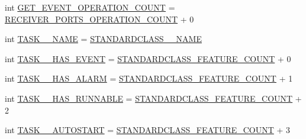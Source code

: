 \begin{DoxyCompactItemize}
\item 
int \hyperlink{interfaceshootingmachineemfmodel_1_1_shootingmachineemfmodel_package_a9000680fce702b54d9bf48bd64789be7}{G\-E\-T\-\_\-\-E\-V\-E\-N\-T\-\_\-\-O\-P\-E\-R\-A\-T\-I\-O\-N\-\_\-\-C\-O\-U\-N\-T} = \hyperlink{interfaceshootingmachineemfmodel_1_1_shootingmachineemfmodel_package_a784cd8ee08945f45f89ceb08f5a717e5}{R\-E\-C\-E\-I\-V\-E\-R\-\_\-\-P\-O\-R\-T\-S\-\_\-\-O\-P\-E\-R\-A\-T\-I\-O\-N\-\_\-\-C\-O\-U\-N\-T} + 0
\item 
int \hyperlink{interfaceshootingmachineemfmodel_1_1_shootingmachineemfmodel_package_a62650844ac979a7c21389bde0193fea2}{T\-A\-S\-K\-\_\-\-\_\-\-N\-A\-M\-E} = \hyperlink{interfaceshootingmachineemfmodel_1_1_shootingmachineemfmodel_package_a06475d7d54d52ee19b2aaf4d5d73c738}{S\-T\-A\-N\-D\-A\-R\-D\-C\-L\-A\-S\-S\-\_\-\-\_\-\-N\-A\-M\-E}
\item 
int \hyperlink{interfaceshootingmachineemfmodel_1_1_shootingmachineemfmodel_package_ab400549825734d82cb9b6835551aacc6}{T\-A\-S\-K\-\_\-\-\_\-\-H\-A\-S\-\_\-\-E\-V\-E\-N\-T} = \hyperlink{interfaceshootingmachineemfmodel_1_1_shootingmachineemfmodel_package_a14037f66989b3107e402142df96ee9aa}{S\-T\-A\-N\-D\-A\-R\-D\-C\-L\-A\-S\-S\-\_\-\-F\-E\-A\-T\-U\-R\-E\-\_\-\-C\-O\-U\-N\-T} + 0
\item 
int \hyperlink{interfaceshootingmachineemfmodel_1_1_shootingmachineemfmodel_package_a86b86fa479cfc7162ae9b30bf99faa27}{T\-A\-S\-K\-\_\-\-\_\-\-H\-A\-S\-\_\-\-A\-L\-A\-R\-M} = \hyperlink{interfaceshootingmachineemfmodel_1_1_shootingmachineemfmodel_package_a14037f66989b3107e402142df96ee9aa}{S\-T\-A\-N\-D\-A\-R\-D\-C\-L\-A\-S\-S\-\_\-\-F\-E\-A\-T\-U\-R\-E\-\_\-\-C\-O\-U\-N\-T} + 1
\item 
int \hyperlink{interfaceshootingmachineemfmodel_1_1_shootingmachineemfmodel_package_a6dfa46683e73ddc332624916d8e636cf}{T\-A\-S\-K\-\_\-\-\_\-\-H\-A\-S\-\_\-\-R\-U\-N\-N\-A\-B\-L\-E} = \hyperlink{interfaceshootingmachineemfmodel_1_1_shootingmachineemfmodel_package_a14037f66989b3107e402142df96ee9aa}{S\-T\-A\-N\-D\-A\-R\-D\-C\-L\-A\-S\-S\-\_\-\-F\-E\-A\-T\-U\-R\-E\-\_\-\-C\-O\-U\-N\-T} + 2
\item 
int \hyperlink{interfaceshootingmachineemfmodel_1_1_shootingmachineemfmodel_package_aec71228b1f838eaeb86efe350e5b1a4f}{T\-A\-S\-K\-\_\-\-\_\-\-A\-U\-T\-O\-S\-T\-A\-R\-T} = \hyperlink{interfaceshootingmachineemfmodel_1_1_shootingmachineemfmodel_package_a14037f66989b3107e402142df96ee9aa}{S\-T\-A\-N\-D\-A\-R\-D\-C\-L\-A\-S\-S\-\_\-\-F\-E\-A\-T\-U\-R\-E\-\_\-\-C\-O\-U\-N\-T} + 3
\item 

\end{DoxyCompactItemize}
